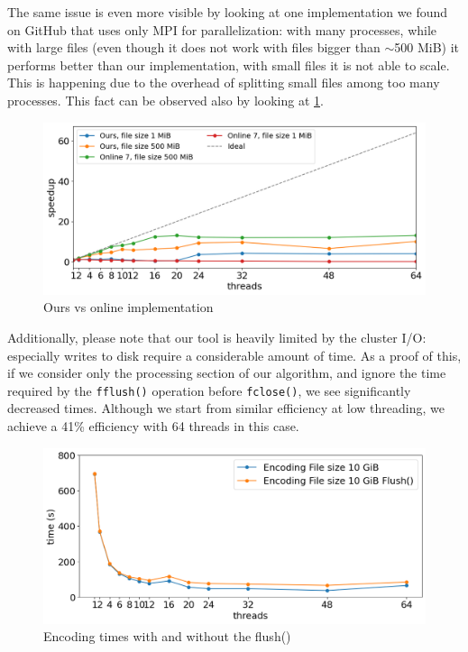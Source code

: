 The same issue is even more visible by looking at one implementation we found on GitHub that uses only MPI for parallelization\cite{HuffmanCodingMPICUDA}: with many processes, while with large files (even though it does not work with files bigger than $\sim$500 MiB) it performs better than our implementation, with small files it is not able to scale. This is happening due to the overhead of splitting small files among too many processes. This fact can be observed also by looking at \cref{fig:ours-vs-online}.
\begin{figure}
	\centering
	\includegraphics[width=1\linewidth]{"../imgs/our vs online 7"}
	\caption{Ours vs online implementation}
	\label{fig:ours-vs-online}
\end{figure}
Additionally, please note that our tool is heavily limited by the cluster I/O: especially writes to disk require a considerable amount of time. As a proof of this, if we consider only the processing section of our algorithm, and ignore the time required by the \verb|fflush()| operation before \verb|fclose()|, we see significantly decreased times. Although we start from similar efficiency at low threading, we achieve a 41\% efficiency with 64 threads in this case. %

\begin{figure}
	\centering
	\includegraphics[width=1\linewidth]{"../imgs/Flush vs non Flush"}
	\caption{Encoding times with and without the flush()}
	\label{fig:flush-vs-non-flush}
\end{figure}

